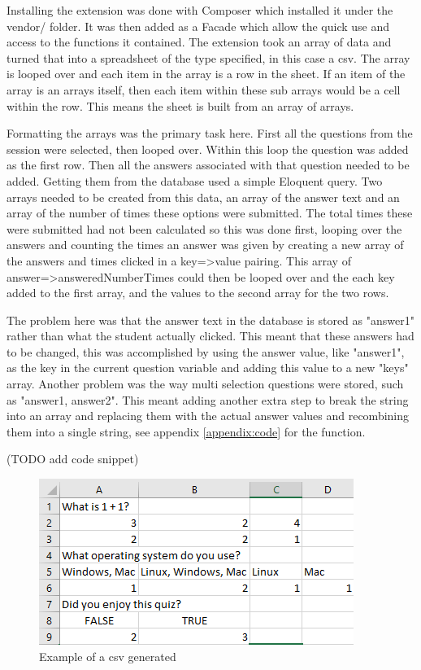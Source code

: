 Installing the extension was done with Composer which installed it under the vendor/ folder. It was then added as a Facade\cite{laravel-facades} which allow the quick use and access to the functions it contained. The extension took an array of data and turned that into a spreadsheet of the type specified, in this case a csv. The array is looped over and each item in the array is a row in the sheet. If an item of the array is an arrays itself, then each item within these sub arrays would be a cell within the row. This means the sheet is built from an array of arrays. 

Formatting the arrays was the primary task here. First all the questions from the session were selected, then looped over. Within this loop the question was added as the first row. Then all the answers associated with that question needed to be added. Getting them from the database used a simple Eloquent query. Two arrays needed to be created from this data, an array of the answer text and an array of the number of times these options were submitted. The total times these were submitted had not been calculated so this was done first, looping over the answers and counting the times an answer was given by creating a new array of the answers and times clicked in a key=>value pairing. This array of answer=>answeredNumberTimes could then be looped over and the each key added to the first array, and the values to the second array for the two rows.

The problem here was that the answer text in the database is stored as "answer1" rather than what the student actually clicked. This meant that these answers had to be changed, this was accomplished by using the answer value, like "answer1", as the key in the current question variable and adding this value to a new "keys" array. Another problem was the way multi selection questions were stored, such as "answer1, answer2". This meant adding another extra step to break the string into an array and replacing them with the actual answer values and recombining them into a single string, see appendix \ref{appendix:code} for the function.

(TODO add code snippet)
\begin{figure}
	\caption{Example of a csv generated}
	\centerline{\includegraphics{Chapter2/Iter-10/csv-example}}
	\label{fig:csv-example}
\end{figure}
